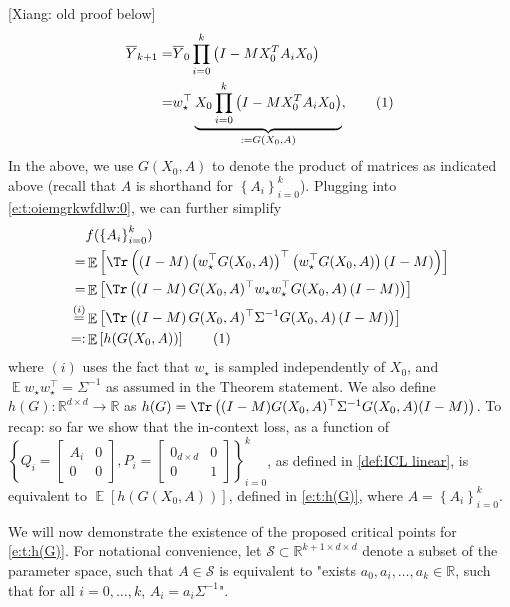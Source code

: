 \documentclass{article}
\DeclareMathOperator{\E}{\mathbb{E}}
\newcommand{\R}{\mathbb{R}}
\renewcommand{\S}{{\mathcal S}}
\newcommand{\wstar}{w_\star}
\newcommand{\ty}[1]{y^{(#1)}}
\newcommand*\lrb[1]{\left[ #1 \right]}
\newcommand*\lrp[1]{\left( #1 \right)}
\newcommand*\lrbb[1]{\left\{ #1 \right\}}
\newcommand\numberthis{\addtocounter{equation}{1}\tag{\theequation}}
\newcommand{\xc}[1]{{\color{black!2!green} [Xiang: #1]}}
\begin{document}
\iffalse
\newpage
\xc{old proof below}
\begin{align*}
\overline{Y}_{k+1} 
=& \overline{Y}_0 \prod_{i=0}^{k} \lrp{I - M X_0^T A_i X_0}\\
=& \wstar^\top \underbrace{X_0 \prod_{i=0}^{k} \lrp{I - M X_0^T A_i X_0}}_{:= G(X_0,A)},
\numberthis \label{e:t:G(X,A)}
\end{align*}
In the above, we use $G(X_0,A)$  to denote the product of matrices as indicated above (recall that $A$ is shorthand for $\lrbb{A_i}_{i=0}^k$). Plugging into \eqref{e:t:oiemgrkwfdlw:0}, we can further simplify
\begin{align*}
& f(\lrbb{A_i}_{i=0}^k) \\
=& \E \lrb{\Tr\lrp{\lrp{I-M} \lrp{\wstar^\top G(X_0,A)}^{\top}\lrp{\wstar^\top G(X_0,A)} \lrp{I-M}}}\\
=& \E \lrb{\Tr\lrp{\lrp{I-M} G(X_0,A)^\top \wstar \wstar^\top G(X_0,A)\lrp{I-M}}}\\
\overset{(i)}{=}& \E \lrb{\Tr\lrp{\lrp{I-M} G(X_0,A)^\top \Sigma^{-1} G(X_0,A)\lrp{I-M}}}\\
=:& \E\lrb{h(G(X_0,A))}
\numberthis \label{e:t:h(G)}
\end{align*}
where $(i)$ uses the fact that $\wstar$ is sampled independently of $X_0$, and $\E{\wstar \wstar^{\top}} = \Sigma^{-1}$ as assumed in the Theorem statement. We also define $h(G): \R^{d \times d} \to \R$ as $h(G) = \Tr\lrp{(I-M) G(X_0,A)^{\top} \Sigma^{-1} G(X_0,A) (I-M)}$. To recap: so far we show that the in-context loss, as a function of $\left\{ Q_i = \begin{bmatrix}
A_i & 0 \\ 
0 & 0
\end{bmatrix}, P_i = \begin{bmatrix}
0_{d\times d} & 0 \\ 
0 & 1 
\end{bmatrix}\right\}_{i=0}^k$, as defined in \eqref{def:ICL linear}, is equivalent to $\E\lrb{h(G(X_0,A))}$, defined in \eqref{e:t:h(G)}, where $A = \lrbb{A_i}_{i=0}^k$. 

We will now demonstrate the existence of the proposed critical points for \eqref{e:t:h(G)}. For notational convenience, let $\S \subset \R^{k+1 \times d \times d}$ denote a subset of the parameter space, such that $A\in \S$ is equivalent to "exists $a_0,a_i,\dots,a_k \in \R$, such that for all $i=0,\dots,k$, $A_i = a_i \Sigma^{-1}$". 
\end{document}
